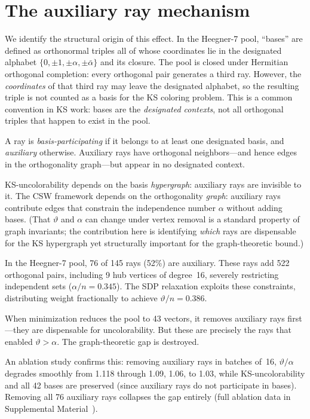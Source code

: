 \documentclass[twocolumn,prl,superscriptaddress,nofootinbib]{revtex4-2}
\begin{document}
\section{The auxiliary ray mechanism}

We identify the structural origin of this effect. In the Heegner-7 pool, ``bases'' are defined as orthonormal triples all of whose coordinates lie in the designated alphabet $\{0, \pm 1, \pm\alpha, \pm\bar\alpha\}$ and its closure. The pool is closed under Hermitian orthogonal completion: every orthogonal pair generates a third ray. However, the \emph{coordinates} of that third ray may leave the designated alphabet, so the resulting triple is not counted as a basis for the KS coloring problem. This is a common convention in KS work: bases are the \emph{designated contexts}, not all orthogonal triples that happen to exist in the pool.

A ray is \emph{basis-participating} if it belongs to at least one designated basis, and \emph{auxiliary} otherwise. Auxiliary rays have orthogonal neighbors---and hence edges in the orthogonality graph---but appear in no designated context.

KS-uncolorability depends on the basis \emph{hypergraph}: auxiliary rays are invisible to it. The CSW framework depends on the orthogonality \emph{graph}: auxiliary rays contribute edges that constrain the independence number $\alpha$ without adding bases.  (That $\vartheta$ and $\alpha$ can change under vertex removal is a standard property of graph invariants; the contribution here is identifying \emph{which} rays are dispensable for the KS hypergraph yet structurally important for the graph-theoretic bound.)

In the Heegner-7 pool, 76 of 145 rays (52\%) are auxiliary. These rays add 522 orthogonal pairs, including 9 hub vertices of degree~16, severely restricting independent sets ($\alpha/n = 0.345$). The SDP relaxation exploits these constraints, distributing weight fractionally to achieve $\vartheta/n = 0.386$.

When minimization reduces the pool to 43 vectors, it removes auxiliary rays first---they are dispensable for uncolorability. But these are precisely the rays that enabled $\vartheta > \alpha$. The graph-theoretic gap is destroyed.

An ablation study confirms this: removing auxiliary rays in batches of~16, $\vartheta/\alpha$ degrades smoothly from 1.118 through 1.09, 1.06, to 1.03, while KS-uncolorability and all 42 bases are preserved (since auxiliary rays do not participate in bases). Removing all 76 auxiliary rays collapses the gap entirely (full ablation data in Supplemental Material~\cite{SupplementalMaterial}).
\end{document}
